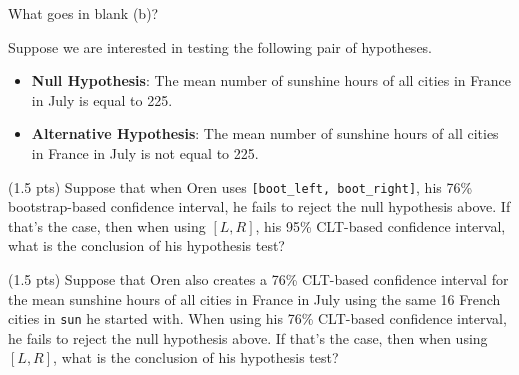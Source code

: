 \begin{prob}[(17 pts)]
\begin{subprobset}
\begin{subprob}
\begin{minipage}[t]{0.4\textwidth}
\inlineresponsebox[2in]{}{}
\end{minipage}
\hfill
\begin{minipage}[t]{0.4\textwidth}
What goes in blank (b)?

\inlineresponsebox[2in]{}{}
\end{minipage}

\end{subprob}

\end{subprobset}

Suppose we are interested in testing the following pair of hypotheses.

\begin{itemize}
    \item \textbf{Null Hypothesis}: The mean number of sunshine hours of all cities in France in July is equal to 225.
    \item \textbf{Alternative Hypothesis}: The mean number of sunshine hours of all cities in France in July is not equal to 225.
\end{itemize}




\begin{subprobset}

\begin{subprob}(1.5 pts) Suppose that when Oren uses \texttt{[boot\_left, boot\_right]}, his 76\% bootstrap-based confidence interval, he fails to reject the null hypothesis above. If that's the case, then when using $[L, R]$, his 95\% CLT-based confidence interval, what is the conclusion of his hypothesis test?


\end{subprob}

\begin{subprob}(1.5 pts) Suppose that Oren also creates a 76\% CLT-based confidence interval for the mean sunshine hours of all cities in France in July using the same 16 French cities in \texttt{sun} he started with. When using his 76\% CLT-based confidence interval, he fails to reject the null hypothesis above. If that's the case, then when using $[L, R]$, what is the conclusion of his hypothesis test?


\end{subprob}
\end{subprobset}
\end{prob}
